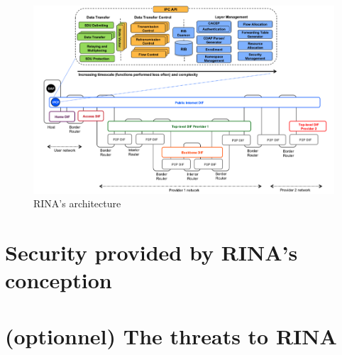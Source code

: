 \documentclass[a4paper]{proc}
\begin{document}
\begin{figure}
    \centering\includegraphics[width=\columnwidth]{arch.png}\caption{RINA's architecture}\label{fig:arch}
\end{figure}

\part{Security provided by RINA's conception}

\part{(optionnel) The threats to RINA}

\nocite{*}
\newpage


\end{document}
